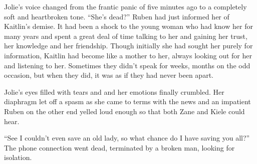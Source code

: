 Jolie's voice changed from the frantic panic of five minutes ago to a completely soft and heartbroken tone.  ``She's dead?''  Ruben had just informed her of Kaitlin's demise.  It had been a shock to the young woman who had know her for many years and spent a great deal of time talking to her and gaining her trust, her knowledge and her friendship.  Though initially she had sought her purely for information, Kaitlin had become like a mother to her, always looking out for her and listening to her.  Sometimes they didn't speak for weeks, months on the odd occasion, but when they did, it was as if they had never been apart.

Jolie's eyes filled with tears and and her emotions finally crumbled.  Her diaphragm let off a spasm as she came to terms with the news and an impatient Ruben on the other end yelled loud enough so that both Zane and Kiele could hear.

``See I couldn't even save an old lady, so what chance do I have saving you all?''  The phone connection went dead, terminated by a broken man, looking for isolation.

